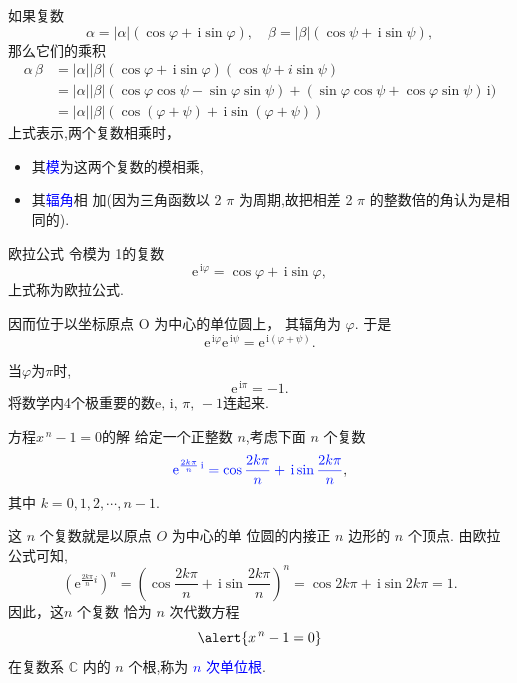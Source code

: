 \documentclass[11pt,punct]{ctexbeamer}
\def\e{\mathrm{e}}
\def\i{\, \mathrm{i}}
\newcommand{\blue}{\textcolor{blue}}
\begin{document}
\begin{frame}
	如果复数
	\[
    \alpha= |\alpha|(\cos \varphi+\i \operatorname{sin} \varphi), \quad
	\beta=|\beta|(\cos \psi+\i \operatorname{sin} \psi),
	\]
	那么它们的乘积
	\[
	\begin{aligned}
		\alpha \, \beta &=|\alpha||\beta|(\cos \varphi+\i \operatorname{sin} \varphi)(\cos \psi+ i \operatorname{sin} \psi) \\
		&=|\alpha||\beta|(\cos \varphi \cos \psi-\sin \varphi \sin \psi)+(\sin \varphi \cos \psi+\cos \varphi \sin \psi) {\i}) \\
		&=|\alpha||\beta|(\cos (\varphi+\psi)+ \i \operatorname{sin}(\varphi+\psi))
	\end{aligned}
	\]
	上式表示,两个\alert{复数相乘}时，
\begin{itemize}
    \item 其\blue{模}为这两个复数的模相乘,
    \item 其\blue{辐角}相 加(因为三角函数以 2 $\pi$ 为周期,故把相差 2 $\pi$ 的整数倍的角认为是相 同的).
\end{itemize}
\end{frame}

\begin{frame}{欧拉公式}
	令模为 1的复数
	\[
	{\e}^{{\i} \varphi}=\cos \varphi+{\i} \sin \varphi,
	\]
	上式称为\alert{欧拉公式}.

	因而位于以坐标原点 O 为中心的单位圆上， 其辐角为 $\varphi$. 于是
	\[
	{\e}^{\i \varphi} {\e}^{{\i} \psi}={\e}^{{\i}(\varphi+\psi)}.
	\]


	当$\varphi$为$\pi$时, $${\e^{\i\pi }=-1}.$$
	将数学内4个极重要的数$\e, \i, \, \pi,\,  -1 $连起来.
\end{frame}



\begin{frame}{方程$x^{\, n}-1=0$的解}
	给定一个正整数 $n$,考虑下面 $n$ 个复数
	\[
	\blue{{\e}^{\frac{2 k \pi }{n}{\i}}=\cos \frac{2 k \pi}{n}+\i\operatorname{sin} \frac{2 k \pi}{n}},
	\]
	其中 $k=0,1,2, \cdots, n-1.$

     这 $n$ 个复数就是以原点 $O$ 为中心的单 位圆的内接正 $n$ 边形的 $n$ 个顶点.
	由欧拉公式可知,
	\[
	\left({\e}^{\frac{2 {k\pi }}{n}i}\right)^{n}=\left(\cos \frac{2 k \pi}{n}+\i \operatorname{sin} \frac{2 k \pi}{n}\right)^{n}=\cos 2 k \pi+{\i} \sin 2 k \pi=1.
	\]
	因此，这$n$ 个复数
    恰为 $n$ 次代数方程 $$\alert{x^{\,n}-1=0}$$ 在复数系 $\mathbb{C}$ 内的 $n$ 个根,称为 \blue{$n$ 次单位根}.

\end{frame}
\end{document}
